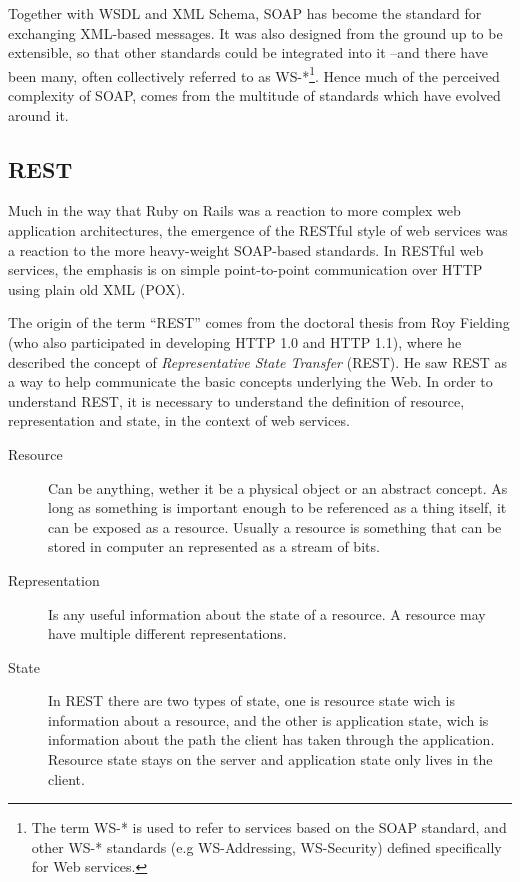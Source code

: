 Together with WSDL and XML Schema, SOAP has become the standard for exchanging XML-based messages. It was also designed from the ground up to be extensible, so that other standards could be integrated into it --and there have been many, often collectively referred to as WS-*\footnote{The term WS-* is used to refer to services based on the SOAP standard, and other WS-* standards (e.g WS-Addressing, WS-Security) defined specifically for Web services.}. Hence much of the perceived complexity of SOAP, comes from the multitude of standards which have evolved around it\cite{Spies:2008}.

\subsection{REST}
Much in the way that Ruby on Rails was a reaction to more complex web application architectures, the emergence of the RESTful style of web services was a reaction to the more heavy-weight SOAP-based standards. In RESTful web services, the emphasis is on simple point-to-point communication over HTTP using plain old XML (POX)\cite{Spies:2008}.

The origin of the term ``REST'' comes from the doctoral thesis from Roy Fielding\cite{Fielding00Phd} (who also participated in developing HTTP 1.0 and HTTP 1.1), where he described the concept of \textit{Representative State Transfer} (REST). He saw REST as a way to help communicate the basic concepts underlying the Web. In order to understand REST, it is necessary to understand the definition of resource, representation and state, in the context of web services.
\begin{description}
\item[Resource] Can be anything, wether it be a physical object or an abstract concept. As long as something is important enough to be referenced as a thing itself, it can be exposed as a resource. Usually a resource is something that can be stored in computer an represented as a stream of bits.
\item[Representation] Is any useful information about the state of a resource. A resource may have multiple different representations.
\item[State] In REST there are two types of state, one is resource state wich is information about a resource, and the other is application state, wich is information about the path the client has taken through the application. Resource state stays on the server and application state only lives in the client.
\end{description}

